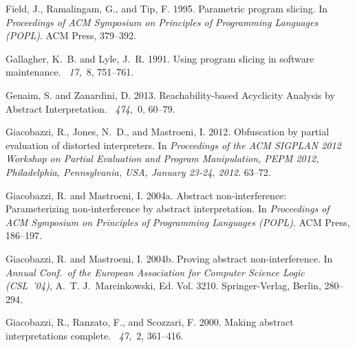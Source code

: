 \documentclass[prodmode,acmtocl]{acmsmall}
\newcommand{\0}{\mbox{\bf 0}}
\begin{document}
\begin{thebibliography}{}
{\sc Field, J.}, {\sc Ramalingam, G.}, {\sc and} {\sc Tip, F.} 1995.
\newblock Parametric program slicing.
\newblock In {\em Proceedings of ACM Symposium on Principles of Programming
  Languages (POPL)}. ACM Press, 379--392.

{\sc Gallagher, K.~B.} {\sc and} {\sc Lyle, J.~R.} 1991.
\newblock Using program slicing in software maintenance.
~{\em 17,\/}~8,
  751--761.

{\sc Genaim, S.} {\sc and} {\sc Zanardini, D.} 2013.
\newblock Reachability-based {A}cyclicity {A}nalysis by {A}bstract
  {I}nterpretation.
~{\em 474,\/}~0, 60--79.

{\sc Giacobazzi, R.}, {\sc Jones, N.~D.}, {\sc and} {\sc Mastroeni, I.} 2012.
\newblock Obfuscation by partial evaluation of distorted interpreters.
\newblock In {\em Proceedings of the {ACM} {SIGPLAN} 2012 Workshop on Partial
  Evaluation and Program Manipulation, {PEPM} 2012, Philadelphia, Pennsylvania,
  USA, January 23-24, 2012}. 63--72.

{\sc Giacobazzi, R.} {\sc and} {\sc Mastroeni, I.} 2004a.
\newblock Abstract non-interference: Parameterizing non-interference by
  abstract interpretation.
\newblock In {\em Proceedings of ACM Symposium on Principles of Programming
  Languages (POPL)}. ACM Press, 186--197.

{\sc Giacobazzi, R.} {\sc and} {\sc Mastroeni, I.} 2004b.
\newblock Proving abstract non-interference.
\newblock In {\em Annual Conf.\ of the European Association for Computer
  Science Logic (CSL~'04)}, {A.~T. J.~Marcinkowski}, Ed. Vol. 3210.
  Springer-Verlag, Berlin, 280--294.

{\sc Giacobazzi, R.}, {\sc Ranzato, F.}, {\sc and} {\sc Scozzari, F.} 2000.
\newblock Making abstract interpretations complete.
~{\em 47,\/}~2, 361--416.


\end{thebibliography}
\end{document}
